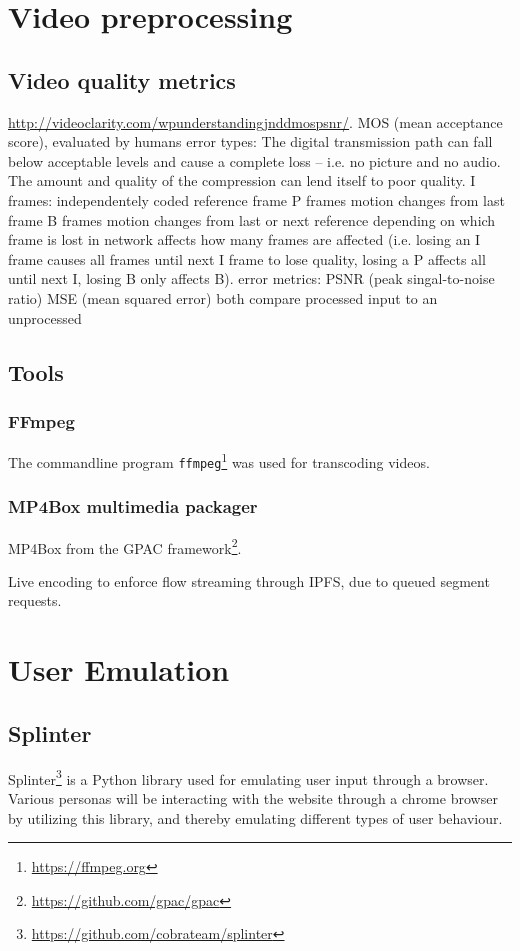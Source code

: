 \section{Video preprocessing}

\subsection{Video quality metrics}

\url{http://videoclarity.com/wpunderstandingjnddmospsnr/}. 
MOS (mean acceptance score), evaluated by humans
error types:
    The digital transmission path can fall below acceptable levels and cause a complete loss – i.e. no picture and no audio.
    The amount and quality of the compression can lend itself to poor quality.
I frames: independentely coded reference frame
P frames motion changes from last frame
B frames motion changes from last or next reference
depending on which frame is lost in network affects how many frames are affected (i.e. losing an I frame causes all frames until next I frame to lose quality, losing a P affects all until next I, losing B only affects B).
error metrics: PSNR (peak singal-to-noise ratio) MSE (mean squared error) both compare processed input to an unprocessed


\subsection{Tools}

\subsubsection{FFmpeg}
The commandline program \texttt{ffmpeg}\footnote{\url{https://ffmpeg.org}} was used for transcoding videos.

\subsubsection{MP4Box multimedia packager}
MP4Box from the GPAC framework\footnote{\url{https://github.com/gpac/gpac}}.

Live encoding to enforce flow streaming through IPFS, due to queued segment requests.


\section{User Emulation}
\subsection{Splinter}
Splinter\footnote{\url{https://github.com/cobrateam/splinter}} is a Python library used for emulating user input through a browser. Various personas will be interacting with the website through a chrome browser by utilizing this library, and thereby emulating different types of user behaviour.

